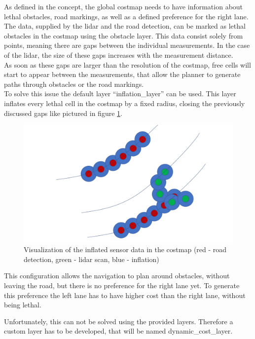 As defined in the concept, the global costmap needs to have information about lethal obstacles, road markings, as well as a defined preference for the right lane.\\


The data, supplied by the lidar and the road detection, can be marked as lethal obstacles in the costmap using the obstacle layer. This data consist solely from points, meaning there are gaps between the individual measurements. In the case of the lidar, the size of these gaps increases with the measurement distance.\\

As soon as these gaps are larger than the resolution of the costmap, free cells will start to appear between the measurements, that allow the planner to generate paths through obstacles or the road markings.\\

To solve this issue the default layer ``inflation\_layer'' can be used. This layer inflates every lethal cell in the costmap by a fixed radius, closing the previously discussed gaps like pictured in figure \ref{costinfl}.\\

\begin{figure}[H]
	\centering
	\includegraphics[width=.7\textwidth]{Pictures/costmap inflation}
	\caption{Visualization of the inflated sensor data in the costmap (red - road detection, green - lidar scan, blue - inflation)}
	\label{costinfl}
\end{figure}

This configuration allows the navigation to plan around obstacles, without leaving the road, but there is no preference for the right lane yet. To generate this preference the left lane has to have higher cost than the right lane, without being lethal.

Unfortunately, this can not be solved using the provided layers. Therefore a custom layer has to be developed, that will be named dynamic\_cost\_layer.

